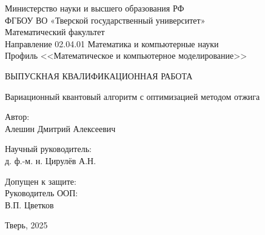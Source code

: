 \documentclass[a4paper]{report}
\begin{document}
\begin{titlepage}
    \begin{center}
        Министерство науки и высшего образования РФ\\
        ФГБОУ ВО «Тверской государственный университет»\\
        Математический факультет\\
        Направление 02.04.01 Математика и компьютерные науки\\
        Профиль <<Математическое и компьютерное моделирование>>
    \end{center}

    \vspace{2.5cm}
    \begin{center}
        {ВЫПУСКНАЯ КВАЛИФИКАЦИОННАЯ РАБОТА }

        \vspace{1.0cm}
        \large{Вариационный квантовый алгоритм с оптимизацией методом отжига}

        \vspace{1.5cm}
    \end{center}

    \begin{flushright}
        \begin{minipage}{80mm}
            Автор:\\
            Алешин Дмитрий Алексеевич

            \vspace{1.0cm}
            Научный руководитель:\\
            д. ф.-м. н. Цирулёв А.Н.
        \end{minipage}
    \end{flushright}

    \vspace{1.6cm}
    \noindent Допущен к защите:\\
    Руководитель ООП:\\[1cm]
    \underline{\qquad \qquad \qquad \qquad \qquad }
    В.П. Цветков \\

    \vspace{2.3cm}
    \vspace{-0.7cm}
    \begin{center}
        Тверь, 2025
    \end{center}
\end{titlepage}

\setcounter{page}{2}

\tableofcontents
\newpage
\end{document}
